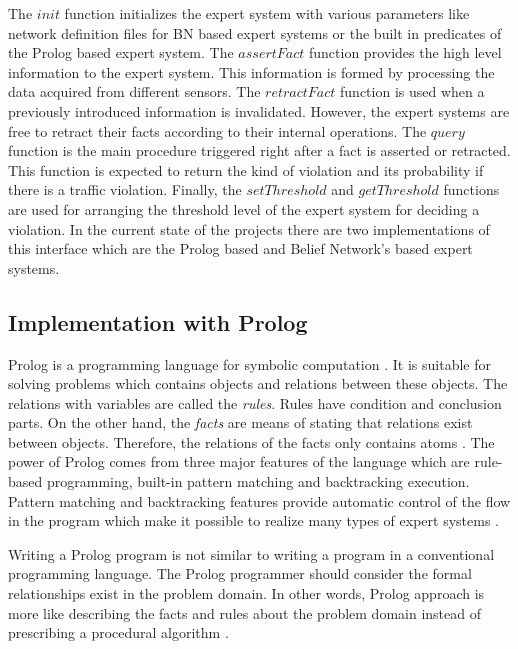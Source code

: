\documentclass[a4paper,oneside,12pt]{report}
\begin{document}
The $init$ function initializes the expert system with various parameters like network definition files for BN based expert systems or the built in predicates of the Prolog based expert system. The $assertFact$ function provides the high level information to the expert system. This information is formed by processing the data acquired from different sensors. The $retractFact$ function is used when a previously introduced information is invalidated. However, the expert systems are free to retract their facts according to their internal operations. The $query$ function is the main procedure triggered right after a fact is asserted or retracted. This function is expected to return the kind of violation and its probability if there is a traffic violation. Finally, the $setThreshold$ and $getThreshold$ functions are used for arranging the threshold level of the expert system for deciding a violation. In the current state of the projects there are two implementations of this interface which are the Prolog based and Belief Network's based expert systems.

\subsection{Implementation with Prolog}

Prolog is a programming language for symbolic computation \cite{bratko_prolog_1986}. It is suitable for solving problems which contains objects and relations between these objects. The relations with variables are called the \textit{rules}. Rules have condition and conclusion parts. On the other hand, the \textit{facts} are means of stating that relations exist between objects. Therefore, the relations of the facts only contains atoms \cite{bratko_prolog_1986, sterling_art_1994}. The power of Prolog comes from three major features of the language which are rule-based programming, built-in pattern matching and backtracking execution. Pattern matching and backtracking features provide automatic control of the flow in the program which make it possible to realize many types of expert systems \cite{merritt_building_2001}. 

Writing a Prolog program is not similar to writing a program in a conventional programming language. The Prolog programmer should consider the formal relationships exist in the problem domain. In other words, Prolog approach is more like describing the facts and rules about the problem domain instead of prescribing a procedural algorithm \cite{clocksin_programming_1994}.
\end{document}
